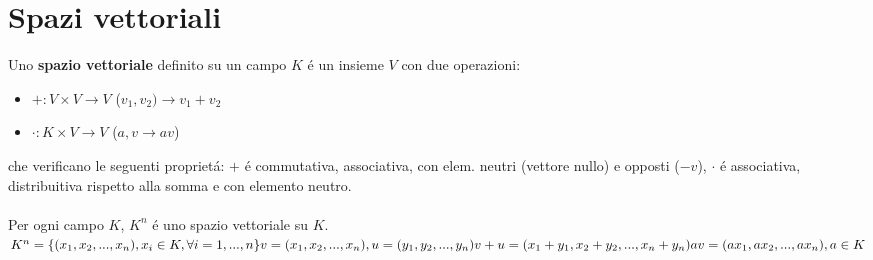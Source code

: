 \documentclass{article}
\begin{document}
\section{Spazi vettoriali}
Uno \textbf{spazio vettoriale} definito su un campo $K$ é un insieme $V$ con due operazioni:
\begin{itemize}
	\item[] $+ : V \times V \rightarrow V$ ($v_1, v_2) \rightarrow v_1 + v_2$
	\item[] $\cdot : K \times V \rightarrow V$ ($a, v \rightarrow av$)
\end{itemize}
che verificano le seguenti proprietá: $+$ é commutativa, associativa, con elem. neutri (vettore nullo) e opposti ($-v$), $\cdot$ é associativa, distribuitiva rispetto alla somma e con elemento neutro.\\\\
Per ogni campo $K$, $K^n$ é uno spazio vettoriale su $K$.\\
$K^n = \{(x_1, x_2, ..., x_n), x_i \in K, \forall i=1, ..., n\} \\
v = (x_1, x_2, ..., x_n), u = (y_1, y_2, ..., y_n) \\
v + u = (x_1 + y_1, x_2 + y_2, ..., x_n + y_n) \\
av = (ax_1, ax_2, ..., ax_n), a \in K
$
\end{document}
